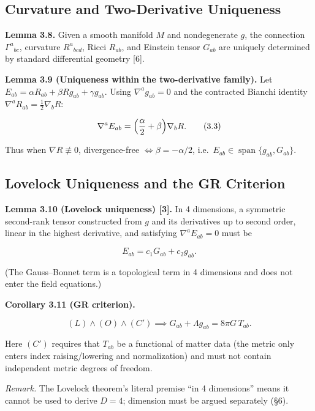 \documentclass[
  11pt,
]{article}
\begin{document}
\subsection{Curvature and Two-Derivative
Uniqueness}\label{curvature-and-two-derivative-uniqueness}

\textbf{Lemma 3.8.} Given a smooth manifold \(M\) and nondegenerate
\(g\), the connection \(\Gamma^a{}_{bc}\), curvature \(R^a{}_{bcd}\),
Ricci \(R_{ab}\), and Einstein tensor \(G_{ab}\) are uniquely determined
by standard differential geometry {[}6{]}.

\textbf{Lemma 3.9 (Uniqueness within the two-derivative family).} Let
\(E_{ab}=\alpha R_{ab}+\beta Rg_{ab}+\gamma g_{ab}\). Using
\(\nabla^ag_{ab}=0\) and the contracted Bianchi identity
\(\nabla^aR_{ab}=\tfrac12\nabla_bR\):

\[
\nabla^aE_{ab}=\Bigl(\frac{\alpha}{2}+\beta\Bigr)\nabla_bR.
\tag{3.3}
\]

Thus when \(\nabla R\not\equiv0\), divergence-free
\(\iff\beta=-\alpha/2\),
i.e.~\(E_{ab}\in\operatorname{span}\{g_{ab},G_{ab}\}\).

\subsection{Lovelock Uniqueness and the GR
Criterion}\label{lovelock-uniqueness-and-the-gr-criterion}

\textbf{Lemma 3.10 (Lovelock uniqueness) {[}3{]}.} In 4 dimensions, a
symmetric second-rank tensor constructed from \(g\) and its derivatives
up to second order, linear in the highest derivative, and satisfying
\(\nabla^aE_{ab}=0\) must be

\[
E_{ab}=c_1G_{ab}+c_2g_{ab}.
\]

(The Gauss--Bonnet term is a topological term in 4 dimensions and does
not enter the field equations.)

\textbf{Corollary 3.11 (GR criterion).}

\[
(L)\wedge(O)\wedge(C') \implies G_{ab}+\Lambda g_{ab}=8\pi G\,T_{ab}.
\tag{3.4}
\]

Here \((C')\) requires that \(T_{ab}\) be a functional of matter data
(the metric only enters index raising/lowering and normalization) and
must not contain independent metric degrees of freedom.

\emph{Remark.} The Lovelock theorem's literal premise ``in 4
dimensions'' means it cannot be used to derive \(D=4\); dimension must
be argued separately (§6).
\end{document}
